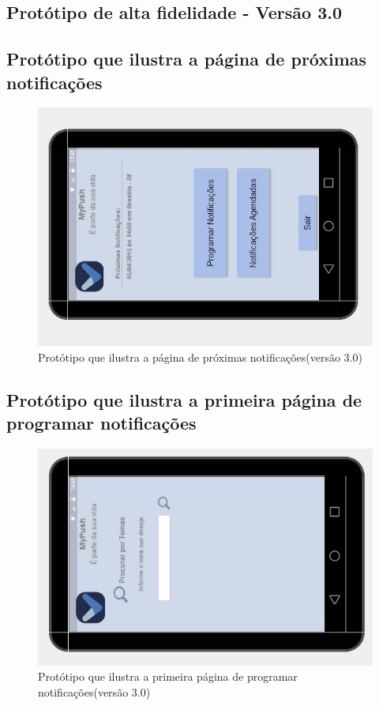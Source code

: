 \begin{apendicesenv}
\chapter{Protótipo de alta fidelidade - Versão 3.0} 

    \pagebreak
    \section*{Protótipo que ilustra a página de próximas notificações}

    \begin{figure}[!htbp]
      \centering
      \includegraphics[scale=0.9, angle=-90]{editaveis/figuras/prototipo_alta_fidelidade_v3/3_1}
      \caption{Protótipo que ilustra a página de próximas notificações(versão 3.0)}
      \label{v3}
    \end{figure}
    
    \pagebreak
      \section*{Protótipo que ilustra a primeira página de programar notificações}

    \begin{figure}[!htbp]
      \centering
      \includegraphics[scale=0.9, angle=-90]{editaveis/figuras/prototipo_alta_fidelidade_v3/3_2}
      \caption{Protótipo que ilustra a primeira página de programar notificações(versão 3.0)}
      \label{v3}
    \end{figure}
    

\end{apendicesenv}
